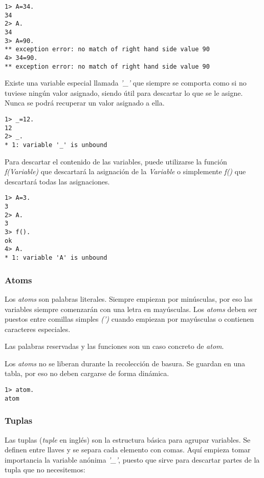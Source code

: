 \begin{lstlisting}
1> A=34.
34
2> A.
34
3> A=90.
** exception error: no match of right hand side value 90
4> 34=90.
** exception error: no match of right hand side value 90
\end{lstlisting}

Existe una variable especial llamada \textit{'_'} que siempre se comporta como si no tuviese ningún valor
asignado, siendo útil para descartar lo que se le asigne. Nunca se podrá recuperar un valor asignado a ella.

\begin{lstlisting}
1> _=12.
12
2> _.
* 1: variable '_' is unbound
\end{lstlisting}

Para descartar el contenido de las variables, puede utilizarse la función \textit{f(Variable)} que descartará
la asignación de la \textit{Variable} o simplemente \textit{f()} que descartará todas las asignaciones.

\begin{lstlisting}
1> A=3.
3
2> A.
3
3> f().
ok
4> A.
* 1: variable 'A' is unbound
\end{lstlisting}

\subsubsection{Atoms}

Los \textit{atoms} son palabras literales. Siempre empiezan por minúsculas, por eso las variables siempre
comenzarán con una letra en mayúsculas. Los \textit{atoms} deben ser puestos entre comillas simples
\textit{(')} cuando empiezan por mayúsculas o contienen caracteres especiales.

Las palabras reservadas y las funciones son un caso concreto de \textit{atom}.

Los \textit{atoms} no se liberan durante la recolección de basura. Se guardan en una tabla, por eso no deben
cargarse de forma dinámica.

\begin{lstlisting}
1> atom.
atom
\end{lstlisting}



\subsubsection{Tuplas}

Las tuplas (\textit{tuple} en inglés) son la estructura básica para agrupar variables. Se definen entre
llaves y se separa cada elemento con comas. Aquí empieza tomar importancia la variable anónima \textit{'_'},
puesto que sirve para descartar partes de la tupla que no necesitemos:

